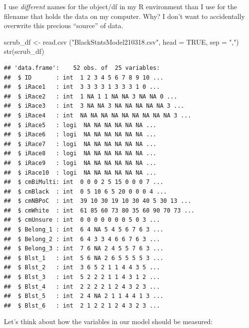 \documentclass[
]{book}
\newenvironment{Shaded}{\begin{snugshade}}{\end{snugshade}}
\newcommand{\AttributeTok}[1]{\textcolor[rgb]{0.77,0.63,0.00}{#1}}
\newcommand{\ConstantTok}[1]{\textcolor[rgb]{0.00,0.00,0.00}{#1}}
\newcommand{\FunctionTok}[1]{\textcolor[rgb]{0.00,0.00,0.00}{#1}}
\newcommand{\NormalTok}[1]{#1}
\newcommand{\OtherTok}[1]{\textcolor[rgb]{0.56,0.35,0.01}{#1}}
\newcommand{\StringTok}[1]{\textcolor[rgb]{0.31,0.60,0.02}{#1}}
\begin{document}
I use \emph{different} names for the object/df in my R environment than I use for the filename that holds the data on my computer. Why? I don't want to accidentally overwrite this precious ``source'' of data.

\begin{Shaded}
\begin{Highlighting}[]
\NormalTok{scrub\_df }\OtherTok{\textless{}{-}} \FunctionTok{read.csv}\NormalTok{ (}\StringTok{"BlackStntsModel210318.csv"}\NormalTok{, }\AttributeTok{head =} \ConstantTok{TRUE}\NormalTok{, }\AttributeTok{sep =} \StringTok{","}\NormalTok{)}
\FunctionTok{str}\NormalTok{(scrub\_df)}
\end{Highlighting}
\end{Shaded}

\begin{verbatim}
## 'data.frame':    52 obs. of  25 variables:
##  $ ID       : int  1 2 3 4 5 6 7 8 9 10 ...
##  $ iRace1   : int  3 3 3 3 1 3 3 3 1 0 ...
##  $ iRace2   : int  1 NA 1 1 NA NA 3 NA NA 0 ...
##  $ iRace3   : int  3 NA NA 3 NA NA NA NA NA 3 ...
##  $ iRace4   : int  NA NA NA NA NA NA NA NA NA 3 ...
##  $ iRace5   : logi  NA NA NA NA NA NA ...
##  $ iRace6   : logi  NA NA NA NA NA NA ...
##  $ iRace7   : logi  NA NA NA NA NA NA ...
##  $ iRace8   : logi  NA NA NA NA NA NA ...
##  $ iRace9   : logi  NA NA NA NA NA NA ...
##  $ iRace10  : logi  NA NA NA NA NA NA ...
##  $ cmBiMulti: int  0 0 0 2 5 15 0 0 0 7 ...
##  $ cmBlack  : int  0 5 10 6 5 20 0 0 0 4 ...
##  $ cmNBPoC  : int  39 10 30 19 10 30 40 5 30 13 ...
##  $ cmWhite  : int  61 85 60 73 80 35 60 90 70 73 ...
##  $ cmUnsure : int  0 0 0 0 0 0 0 5 0 3 ...
##  $ Belong_1 : int  6 4 NA 5 4 5 6 7 6 3 ...
##  $ Belong_2 : int  6 4 3 3 4 6 6 7 6 3 ...
##  $ Belong_3 : int  7 6 NA 2 4 5 5 7 6 3 ...
##  $ Blst_1   : int  5 6 NA 2 6 5 5 5 5 3 ...
##  $ Blst_2   : int  3 6 5 2 1 1 4 4 3 5 ...
##  $ Blst_3   : int  5 2 2 2 1 1 4 3 1 2 ...
##  $ Blst_4   : int  2 2 2 2 1 2 4 3 2 3 ...
##  $ Blst_5   : int  2 4 NA 2 1 1 4 4 1 3 ...
##  $ Blst_6   : int  2 1 2 2 1 2 4 3 2 3 ...
\end{verbatim}

Let's think about how the variables in our model should be measured:
\end{document}
